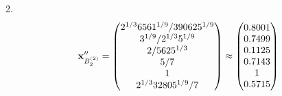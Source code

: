 \documentclass[10pt,a4paper]{article}
\begin{document}
	2.
	\[
		\bold{x}''_{B_2^{(2)}} = 
		\begin{pmatrix}
			{{2^ {1 / 3}}{6561^ {1 / 9}}} / {{390625^ {1 / 9}}} \\
			{{3^ {1 / 9}}} / {{2^ {1 / 3}}{5^ {1 / 9}}} \\
			{{2}} / {{5625^ {1 / 3}}} \\
			{{5}} / {{7}} \\
			{1}{} \\
			{{2^ {1 / 3}}{32805^ {1 / 9}}} / {{7}} \\
		\end{pmatrix}
		\approx
		\begin{pmatrix}
			0.8001   \\
			0.7499   \\
			0.1125   \\
			0.7143   \\
			1        \\
			0.5715   \\
		\end{pmatrix}
	\]

\end{document}

